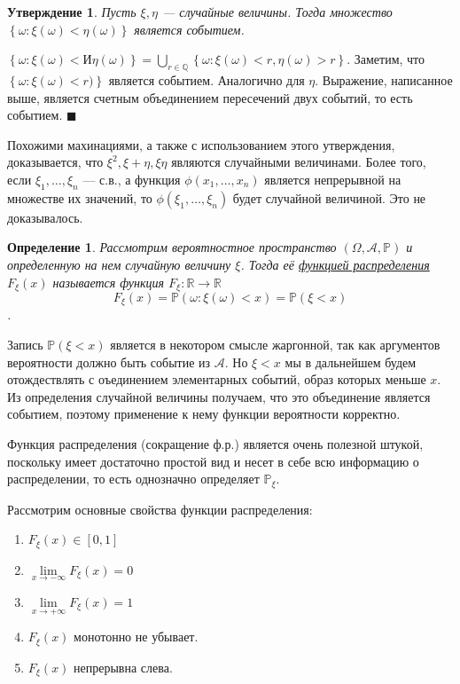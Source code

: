 \documentclass[12pt]{article}
\newtheorem{Def}{Определение}
\newtheorem{St}{Утверждение}
\newenvironment{Proof}{\par\noindent{\bf Доказательство}}{$\blacksquare$}
\numberwithin{Th}{section}
\numberwithin{Def}{section}
\numberwithin{Lem}{section}
\numberwithin{St}{section}
\numberwithin{equation}{section}
\newcommand\Set[2]{\left\{ #1 \colon #2 \right\}}
\newcommand\Pro{\mathbb{P}} %
\newcommand\Ev{\mathscr{A}} %
\newcommand\Real{\mathbb{R}} %
\begin{document}
\begin{St}
Пусть $\xi, \eta$ --- случайные величины. Тогда множество $\Set{\omega}{\xi(\omega) < \eta(\omega)}$ является событием.
\end{St}
\begin{Proof}
$\Set{\omega}{\xi(\omega) < И\eta(\omega)} = \bigcup\limits_{r \in \mathbb{Q}}\Set{\omega}{\xi(\omega) < r, \eta(\omega) > r}$. 
Заметим, что $\Set{\omega}{\xi(\omega) < r)}$ является событием. Аналогично для $\eta$. Выражение, написанное выше, является счетным объединением пересечений двух событий, то есть событием.
\end{Proof}

Похожими махинациями, а также с использованием этого утверждения, доказывается, что $\xi^2, \xi + \eta, \xi\eta$ являются случайными величинами.
Более того, если $\xi_1, \ldots, \xi_n$ --- с.в., а функция $\phi(x_1, \ldots, x_n)$ является непрерывной на множестве их значений, то $\phi(\xi_1, \ldots, \xi_n)$ будет случайной 
величиной. Это не доказывалось.

\begin{Def}
Рассмотрим вероятностное пространство $(\Omega, \Ev, \Pro)$ и определенную на нем случайную величину $\xi$. Тогда её \underline{функцией распределения $F_\xi(x)$}
 называется функция $F_\xi : \Real \to \Real$
$$F_\xi(x) = \Pro(\omega : \xi(\omega) < x) = \Pro(\xi < x)$$.
\end{Def}

Запись $\Pro(\xi < x)$ является в некотором смысле жаргонной, так как аргументов вероятности должно быть событие из $\Ev$. Но $\xi < x$ мы в дальнейшем будем 
отождествлять с оъединением элементарных событий, образ которых меньше $x$. Из определения случайной величины получаем, что это объединение является событием,
поэтому применение к нему функции вероятности корректно.

Функция распределения (сокращение ф.р.) является очень полезной штукой, поскольку имеет достаточно простой вид и несет в себе всю информацию о распределении, то есть однозначно 
определяет $\Pro_\xi$.

Рассмотрим основные свойства функции распределения:
\begin{enumerate}
	\item $F_\xi(x) \in [0, 1]$
	\item $\lim\limits_{x \to -\infty} F_\xi(x) = 0$
	\item $\lim\limits_{x \to +\infty} F_\xi(x) = 1$
	\item $F_\xi(x)$ монотонно не убывает.
	\item $F_\xi(x)$ непрерывна слева.
\end{enumerate}
\end{document}
